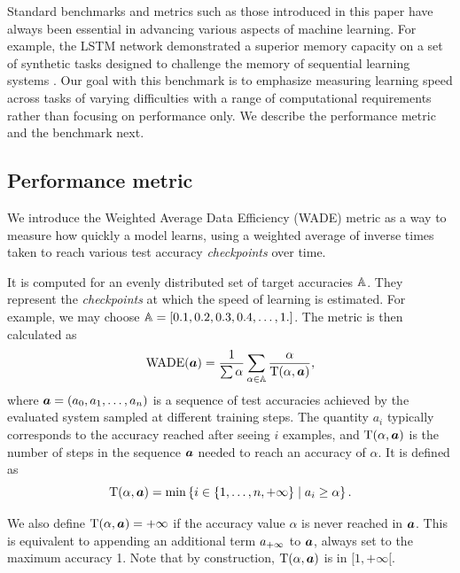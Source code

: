 Standard benchmarks and metrics such as those introduced in this paper have
always been essential in advancing various aspects of machine learning. For
example, the LSTM network demonstrated a superior memory capacity on a set of
synthetic tasks designed to challenge the memory of sequential learning systems
\cite{hochreiterLongShortTermMemory1997}. Our goal with this benchmark is to
emphasize measuring learning speed across tasks of varying difficulties with a
range of computational requirements rather than focusing on performance only. We describe the performance metric and the benchmark next.



\subsection{Performance metric\label{sec:performance-metric}}

We introduce the Weighted Average Data Efficiency (WADE) metric as a way to
measure how quickly a model learns, using a weighted average of inverse times
taken to reach various test accuracy \emph{checkpoints} over time.

It is computed for an evenly distributed set of target accuracies ${\mathbb{A}}$. They
represent the \emph{checkpoints} at which the speed of learning is estimated.
For example, we may choose ${\mathbb{A}} = [0.1, 0.2, 0.3, 0.4, \ldots, 1.]$. The metric is
then calculated as
\begin{equation}
\text{WADE}({\bm{a}}) = \frac{1}{\sum \alpha} \sum_{\alpha \in \mathbb{A}}\frac{\alpha}{\text{T}(\alpha, {\bm{a}})},
\label{eq:wade}
\end{equation}
where ${\bm{a}} = ({a}_{0}, {a}_{1}, \ldots, {a}_{n})$ is a sequence of test accuracies achieved by the evaluated system
sampled at different training steps. The quantity $a_{i}$ typically
corresponds to the accuracy reached after seeing $i$ examples, and
$\text{T}(\alpha, {\bm{a}})$ is the number of steps in the sequence ${\bm{a}}$ needed to reach
an accuracy of $\alpha$. It is defined as
\begin{equation}
  \text{T}(\alpha, {\bm{a}}) = \min\left\{ i \in \{1, \ldots, n, + \infty \}\; |\; a_{i} \geq \alpha \right\}.
\label{eq:tto}
\end{equation}

We also define $\text{T}(\alpha, {\bm{a}}) = +\infty$ if the accuracy value $\alpha$ is never
reached in ${\bm{a}}$. This is equivalent to appending an additional term ${a}_{+\infty}$
to ${\bm{a}}$, always set to the maximum accuracy 1. Note that by construction,
$\text{T}(\alpha, {\bm{a}})$ is in $[1, + \infty [$.

